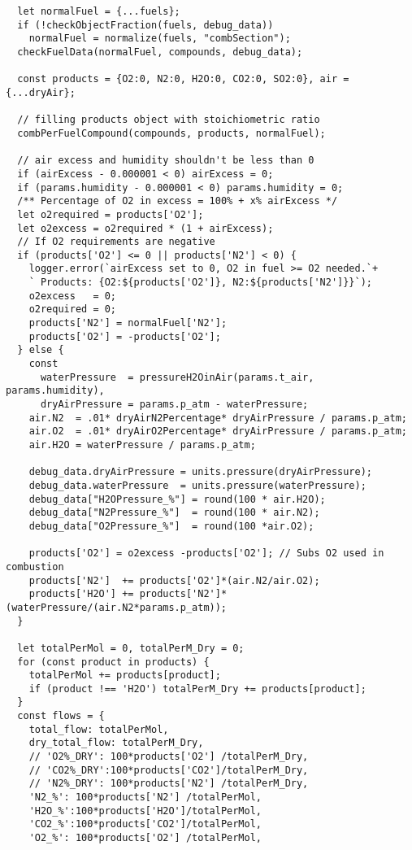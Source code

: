 \begin{verbatim}
  let normalFuel = {...fuels};
  if (!checkObjectFraction(fuels, debug_data)) 
    normalFuel = normalize(fuels, "combSection");
  checkFuelData(normalFuel, compounds, debug_data);

  const products = {O2:0, N2:0, H2O:0, CO2:0, SO2:0}, air = {...dryAir};

  // filling products object with stoichiometric ratio
  combPerFuelCompound(compounds, products, normalFuel);

  // air excess and humidity shouldn't be less than 0
  if (airExcess - 0.000001 < 0) airExcess = 0;
  if (params.humidity - 0.000001 < 0) params.humidity = 0;
  /** Percentage of O2 in excess = 100% + x% airExcess */
  let o2required = products['O2'];
  let o2excess = o2required * (1 + airExcess);
  // If O2 requirements are negative 
  if (products['O2'] <= 0 || products['N2'] < 0) {
    logger.error(`airExcess set to 0, O2 in fuel >= O2 needed.`+
    ` Products: {O2:${products['O2']}, N2:${products['N2']}}`);
    o2excess   = 0;
    o2required = 0;
    products['N2'] = normalFuel['N2'];
    products['O2'] = -products['O2'];
  } else {
    const 
      waterPressure  = pressureH2OinAir(params.t_air, params.humidity),
      dryAirPressure = params.p_atm - waterPressure;
    air.N2  = .01* dryAirN2Percentage* dryAirPressure / params.p_atm;
    air.O2  = .01* dryAirO2Percentage* dryAirPressure / params.p_atm;
    air.H2O = waterPressure / params.p_atm;
    
    debug_data.dryAirPressure = units.pressure(dryAirPressure);
    debug_data.waterPressure  = units.pressure(waterPressure);
    debug_data["H2OPressure_%"] = round(100 * air.H2O);
    debug_data["N2Pressure_%"]  = round(100 * air.N2);
    debug_data["O2Pressure_%"]  = round(100 *air.O2);

    products['O2'] = o2excess -products['O2']; // Subs O2 used in combustion
    products['N2']  += products['O2']*(air.N2/air.O2);
    products['H2O'] += products['N2']*(waterPressure/(air.N2*params.p_atm));
  }

  let totalPerMol = 0, totalPerM_Dry = 0;
  for (const product in products) {
    totalPerMol += products[product];
    if (product !== 'H2O') totalPerM_Dry += products[product];
  }
  const flows = {
    total_flow: totalPerMol,
    dry_total_flow: totalPerM_Dry,
    // 'O2%_DRY': 100*products['O2'] /totalPerM_Dry,
    // 'CO2%_DRY':100*products['CO2']/totalPerM_Dry,
    // 'N2%_DRY': 100*products['N2'] /totalPerM_Dry,
    'N2_%': 100*products['N2'] /totalPerMol,
    'H2O_%':100*products['H2O']/totalPerMol,
    'CO2_%':100*products['CO2']/totalPerMol,
    'O2_%': 100*products['O2'] /totalPerMol,
    

\end{verbatim}
